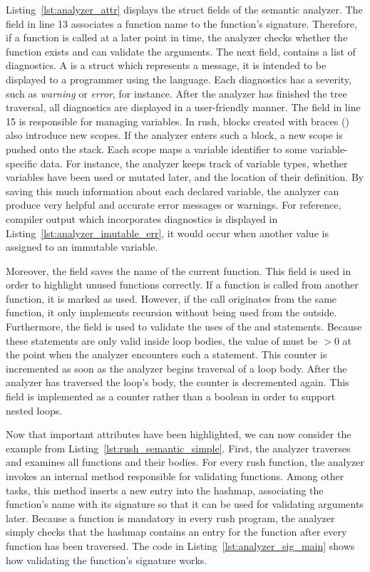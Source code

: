 Listing~\ref{lst:analyzer_attr} displays the struct fields of the semantic analyzer.
The field  in line 13 associates a function name to the function's signature.
Therefore, if a function is called at a later point in time, the analyzer checks whether the function exists and can validate the arguments.
The next field,  contains a list of diagnostics.
A  is a struct which represents a message, it is intended to be displayed to a programmer using the language.
Each diagnostics has a severity, such as \emph{warning} or \emph{error}, for instance.
After the analyzer has finished the tree traversal, all diagnostics are displayed in a user-friendly manner.
The  field in line 15 is responsible for managing variables.
In rush, blocks created with braces (\qVerb{{}}) also introduce new scopes.
If the analyzer enters such a block, a new scope is pushed onto the  stack.
Each scope maps a variable identifier to some variable-specific data.
For instance, the analyzer keeps track of variable types, whether variables have been used or mutated later, and the location of their definition.
By saving this much information about each declared variable, the analyzer can produce very helpful and accurate error messages or warnings.
For reference, compiler output which incorporates diagnostics is displayed in Listing~\ref{lst:analyzer_imutable_err},
it would occur when another value is assigned to an immutable variable.

Moreover, the field  saves the name of the current function.
This field is used in order to highlight unused functions correctly.
If a function is called from another function, it is marked as used.
However, if the call originates from the same function, it only implements recursion without being used from the outside.
Furthermore, the  field is used to validate the uses of the  and  statements.
Because these statements are only valid inside loop bodies, the value of  must be $> 0$ at the point when the analyzer encounters such a statement.
This counter is incremented as soon as the analyzer begins traversal of a loop body.
After the analyzer has traversed the loop's body, the counter is decremented again.
This field is implemented as a counter rather than a boolean in order to support nested loops.

Now that important attributes have been highlighted, we can now consider the example from Listing~\ref{lst:rush_semantic_simple}.
First, the analyzer traverses and examines all functions and their bodies.
For every rush function, the analyzer invokes an internal method responsible for validating functions.
Among other tasks, this method inserts a new entry into the  hashmap,
associating the function's name with its signature so that it can be used for validating arguments later.
Because a  function is mandatory in every rush program,
the analyzer simply checks that the  hashmap contains an entry for the  function after every function has been traversed.
The code in Listing~\ref{lst:analyzer_sig_main} shows how validating the  function's signature works.

